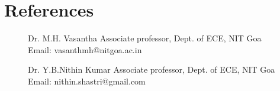 \documentclass[fontsize=11pt]{tccv}
\begin{document}
\section{References}
\vspace{-1em}
\begin{figure}[!h]
    \begin{minipage}{.5\textwidth}
\begin{refer}
\item {Dr. M.H. Vasantha}
      {Associate professor, Dept. of ECE, NIT Goa}
      {Email: vasanthmh@nitgoa.ac.in}
\end{refer}
    \end{minipage}%
    \begin{minipage}{0.5\textwidth}
    \begin{refer}
\item {Dr. Y.B.Nithin Kumar}
      {Associate professor, Dept. of ECE, NIT Goa}
      {Email: nithin.shastri@gmail.com}
      \end{refer}
    \end{minipage}
\end{figure}
\end{document}
